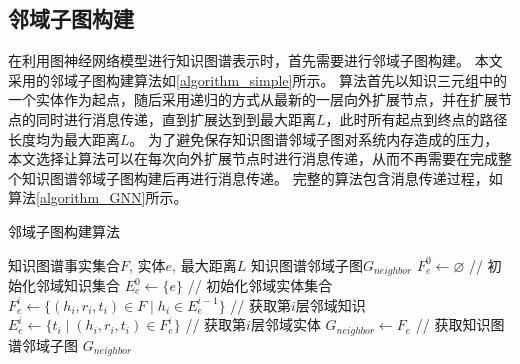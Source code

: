 \documentclass[algorithmlist, AutoFakeBold, AutoFakeSlant, figurelist, tablelist, nomlist, engineering]{seuthesix}
\begin{document}
\subsection{邻域子图构建}
在利用图神经网络模型进行知识图谱表示时，首先需要进行邻域子图构建。
本文采用的邻域子图构建算法如\ref{algorithm_simple}所示。
算法首先以知识三元组中的一个实体作为起点，随后采用递归的方式从最新的一层向外扩展节点，并在扩展节点的同时进行消息传递，直到扩展达到到最大距离$L$，此时所有起点到终点的路径长度均为最大距离$L$。
为了避免保存知识图谱邻域子图对系统内存造成的压力，本文选择让算法可以在每次向外扩展节点时进行消息传递，从而不再需要在完成整个知识图谱邻域子图构建后再进行消息传递。
完整的算法包含消息传递过程，如算法\ref{algorithm_GNN}所示。
\begin{algorithm}[tb]
	\caption{邻域子图构建算法}
	\label{algorithm_simple}
	\begin{algorithmic}[1]
  \Require 知识图谱事实集合$F$, 实体$e$, 最大距离$L$
  \Ensure 知识图谱邻域子图$G_{neighbor}$
  \State $F_{e}^{0} \leftarrow \varnothing$ // 初始化邻域知识集合
  \State $E_{e}^{0} \leftarrow \{e\}$ // 初始化邻域实体集合
  \State $F_{e}^{i} \leftarrow \{(h_i, r_i, t_i) \in F \mid h_i \in E_{e}^{i-1}\}$ // 获取第$i$层邻域知识
  \State $E_{e}^{i} \leftarrow \{t_i \mid (h_i, r_i, t_i) \in F_{e}^{i}\}$ // 获取第$i$层邻域实体
  \EndFor
  \State $G_{neighbor} \leftarrow F_{e}$ // 获取知识图谱邻域子图
  \State \Return $G_{neighbor}$
	\end{algorithmic}
\end{algorithm} 
\end{document}
